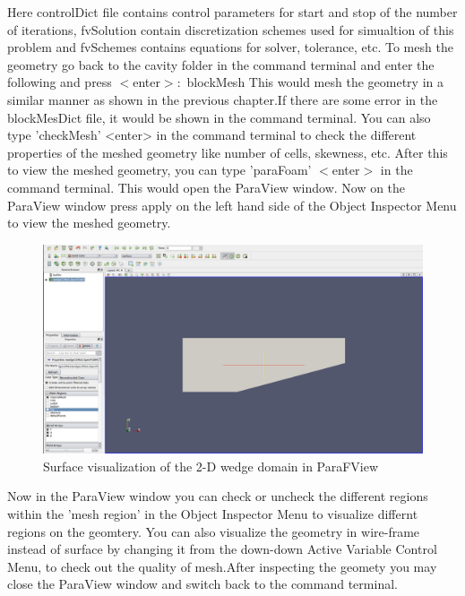\documentclass[a4paper,12pt]{report}
\begin{document}
\flushleft Here controlDict file contains control parameters for start and stop of the number of iterations, fvSolution contain discretization schemes used for simualtion of this problem and fvSchemes contains equations for solver, tolerance, etc.
\flushleft To mesh the geometry go back to the cavity folder in the command terminal and enter the following and press $<$enter$>$$:$
\flushleft blockMesh
\flushleft This would mesh the geometry in a similar manner as shown in the previous chapter.If there are some error in the blockMesDict file, it would be shown in the command terminal. You can also type 'checkMesh' <enter> in the command terminal to check the different properties of the meshed geometry like number of cells, skewness, etc. 
\flushleft After this to view the meshed geometry, you can type 'paraFoam' $<$enter$>$ in the command terminal. This would open the ParaView window. Now on the ParaView window press apply on the left hand side of the Object Inspector Menu to view the meshed geometry. 

\begin{figure}[ht]  
\begin{center}  
\includegraphics[scale=0.24]{para1.png}
\caption{Surface visualization of the 2-D wedge domain in ParaFView}
\label{para1}
\end{center}  
\end{figure}

\flushleft Now in the ParaView window you can check or uncheck the different regions within the 'mesh region' in  the Object Inspector Menu to visualize differnt regions on the geomtery. You can also visualize the geometry in wire-frame instead of surface by changing it from the down-down Active Variable Control Menu, to check out the quality of mesh.After inspecting the geomety you may close the ParaView window and switch back to the command terminal.
\end{document}
